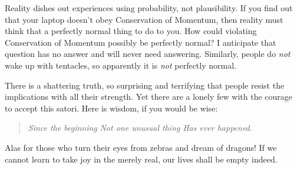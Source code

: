 {
 Reality dishes out experiences using probability, not
plausibility. If you find out that your laptop doesn't
obey Conservation of Momentum, then reality must think that a perfectly
normal thing to do to you. How could violating Conservation of Momentum
possibly be perfectly normal? I anticipate that question has no answer
and will never need answering. Similarly, people do \textit{not} wake
up with tentacles, so apparently it is \textit{not} perfectly normal.}

\hr

{
 There is a shattering truth, so surprising and terrifying that
people resist the implications with all their strength. Yet there are a
lonely few with the courage to accept this satori. Here is wisdom, if
you would be wise:}

\begin{quote}
{
 \textit{Since the beginning}\newline
 \textit{Not one unusual thing}\newline
 \textit{Has ever happened.}}
\end{quote}

{
 Alas for those who turn their eyes from zebras and dream of
dragons! If we cannot learn to take joy in the merely real, our lives
shall be empty indeed.}

\myendsectiontext


\bigskip




